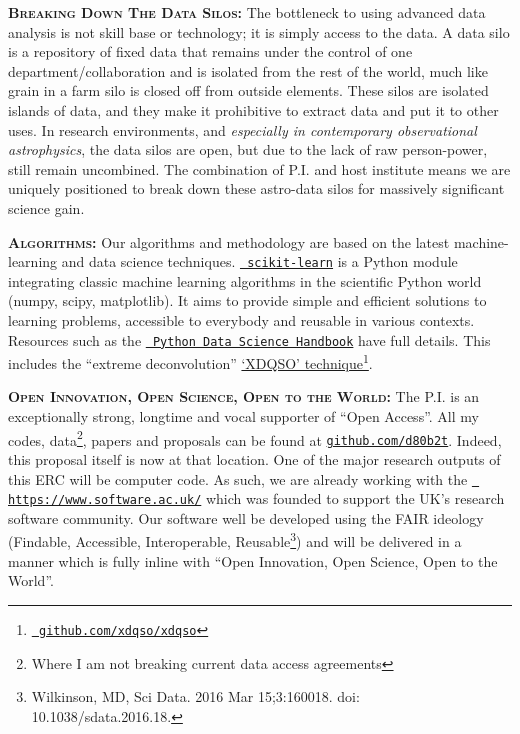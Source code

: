 \smallskip
\smallskip
\noindent
\textbf{\textsc{Breaking Down The Data Silos: }}
The bottleneck to using advanced data analysis is not skill base or
technology; it is simply access to the data.  A data silo is a
repository of fixed data that remains under the control of one
department/collaboration and is isolated from the rest of the world,
much like grain in a farm silo is closed off from outside
elements. These silos are isolated islands of data, and they make it
prohibitive to extract data and put it to other uses. In research
environments, and {\it especially in contemporary observational
astrophysics}, the data silos are open, but due to the lack of raw
person-power, still remain uncombined. The combination of P.I. and
host institute means we are uniquely positioned to break down these
astro-data silos for massively significant science gain.


\smallskip
\smallskip
\noindent
\textbf{\textsc{Algorithms: }}
Our algorithms and methodology are based on the latest
machine-learning and data science
techniques. \href{http://ogrisel.github.io/scikit-learn.org/sklearn-tutorial/index.html}{\tt
scikit-learn} is a Python module integrating classic machine learning
algorithms in the scientific Python world (numpy, scipy,
matplotlib). It aims to provide simple and efficient solutions to
learning problems, accessible to everybody and reusable in various
contexts. Resources such as the
\href{https://github.com/jakevdp/PythonDataScienceHandbook}{{\tt
Python Data Science Handbook}} have full details. This includes the
``extreme deconvolution''
\href{http://www.sdss.org/dr14/data\_access/value-added-catalogs/?vac\_id=xdqso/}{`XDQSO'
technique}\footnote{\href{https://github.com/xdqso/xdqso}{\tt
github.com/xdqso/xdqso}}.



\smallskip
\smallskip
\noindent
\textbf{\textsc{Open Innovation, Open Science, Open to the World:}} 
The P.I. is an exceptionally strong, longtime and vocal supporter of
``Open Access''.  All my codes, data\footnote{Where I am not breaking
current data access agreements}, papers and proposals can be found at
\href{github.com/d80b2t}{{\tt github.com/d80b2t}}.  Indeed, this
proposal itself is now at that location.  One of the major research
outputs of this ERC will be computer code.  As such, we are already
working with the \href{The Software Sustainability Institute}{\tt
https://www.software.ac.uk/} which was founded to support the UK's
research software community.  Our software well be developed using the
FAIR ideology (Findable, Accessible, Interoperable,
Reusable\footnote{Wilkinson, MD, Sci Data. 2016 Mar 15;3:160018. doi:
10.1038/sdata.2016.18.})  and will be delivered in a manner which is
fully inline with ``Open Innovation, Open Science, Open to the
World''.



